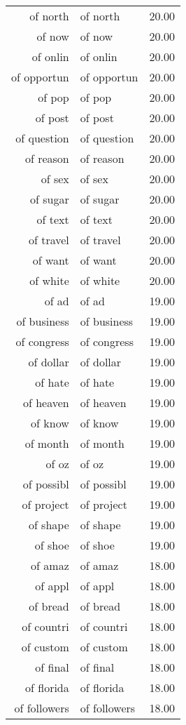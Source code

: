 \begin{table}[ht]
\begin{tabular}{rlr}
  of north & of north & 20.00 \\ 
  of now & of now & 20.00 \\ 
  of onlin & of onlin & 20.00 \\ 
  of opportun & of opportun & 20.00 \\ 
  of pop & of pop & 20.00 \\ 
  of post & of post & 20.00 \\ 
  of question & of question & 20.00 \\ 
  of reason & of reason & 20.00 \\ 
  of sex & of sex & 20.00 \\ 
  of sugar & of sugar & 20.00 \\ 
  of text & of text & 20.00 \\ 
  of travel & of travel & 20.00 \\ 
  of want & of want & 20.00 \\ 
  of white & of white & 20.00 \\ 
  of ad & of ad & 19.00 \\ 
  of business & of business & 19.00 \\ 
  of congress & of congress & 19.00 \\ 
  of dollar & of dollar & 19.00 \\ 
  of hate & of hate & 19.00 \\ 
  of heaven & of heaven & 19.00 \\ 
  of know & of know & 19.00 \\ 
  of month & of month & 19.00 \\ 
  of oz & of oz & 19.00 \\ 
  of possibl & of possibl & 19.00 \\ 
  of project & of project & 19.00 \\ 
  of shape & of shape & 19.00 \\ 
  of shoe & of shoe & 19.00 \\ 
  of amaz & of amaz & 18.00 \\ 
  of appl & of appl & 18.00 \\ 
  of bread & of bread & 18.00 \\ 
  of countri & of countri & 18.00 \\ 
  of custom & of custom & 18.00 \\ 
  of final & of final & 18.00 \\ 
  of florida & of florida & 18.00 \\ 
  of followers & of followers & 18.00 \\ 

\end{tabular}
\end{table}
